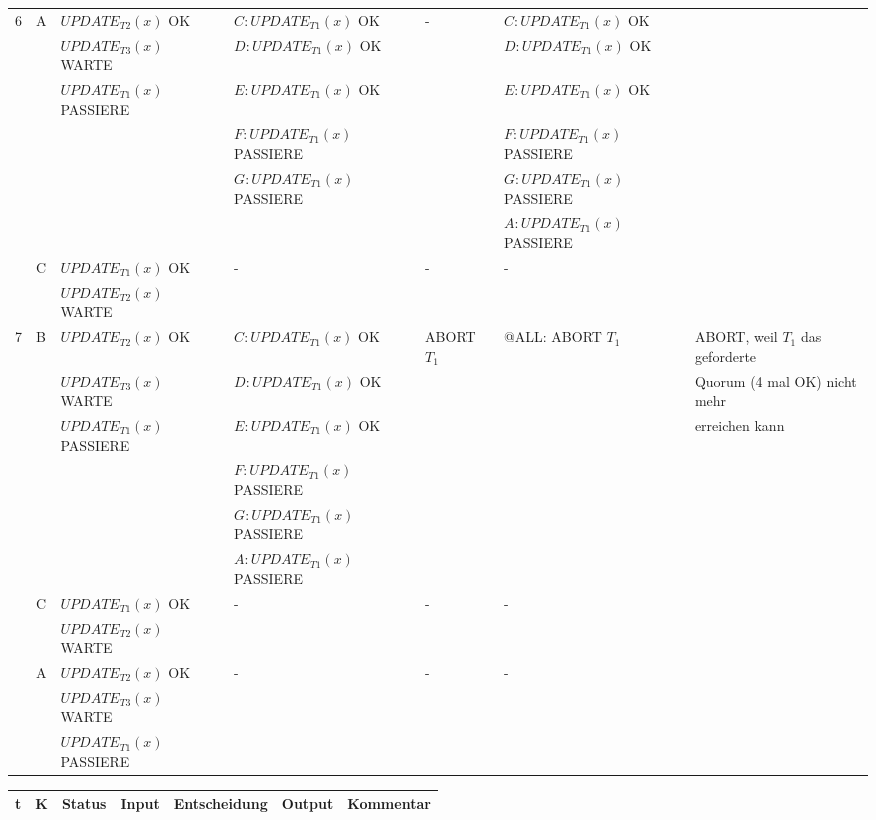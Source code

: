 \documentclass[a4paper]{article}
\begin{document}
\begin{landscape}
\begin{tabular}{| l | l | l | l | l | l | p{5cm} |}
6 & \multirow{6}{*}{A} 
			&    $UPDATE_{T2}(x)$ OK	      &  $C: UPDATE_{T1}(x)$ OK 	& - &	$C: UPDATE_{T1}(x)$ OK &\\
			&&  $UPDATE_{T3}(x)$ WARTE  & $D: UPDATE_{T1}(x)$ OK  &    &   $D: UPDATE_{T1}(x)$ OK & \\
			&&  $UPDATE_{T1}(x)$ PASSIERE & $E: UPDATE_{T1}(x)$ OK &    &  $E: UPDATE_{T1}(x)$ OK & \\
			& &																	   	& $F: UPDATE_{T1}(x)$ PASSIERE & & $F: UPDATE_{T1}(x)$ PASSIERE &\\
			& &																	   	& $G: UPDATE_{T1}(x)$ PASSIERE & & $G: UPDATE_{T1}(x)$ PASSIERE& \\
			& &																	   	&																					 & & $A: UPDATE_{T1}(x)$ PASSIERE& \\
\cline{2-7}
& \multirow{2}{*}{C} 
			&   $UPDATE_{T1}(x)$ OK 		& - 	& - &	 -  &\\
			&& $UPDATE_{T2}(x)$ WARTE   &   &   &	   &  \\
\hline
\hline


7 & \multirow{6}{*}{B} 
			&    $UPDATE_{T2}(x)$ OK	      &  $C: UPDATE_{T1}(x)$ OK 	& ABORT $T_1$ & @ALL: ABORT $T_1$ & ABORT, weil $T_1$ das geforderte\\
			&&  $UPDATE_{T3}(x)$ WARTE  & $D: UPDATE_{T1}(x)$ OK  &    &   & Quorum (4 mal OK) nicht mehr \\
			&&  $UPDATE_{T1}(x)$ PASSIERE & $E: UPDATE_{T1}(x)$ OK &    &  & erreichen kann \\
			& &																	   	& $F: UPDATE_{T1}(x)$ PASSIERE & & &\\
			& &																	   	& $G: UPDATE_{T1}(x)$ PASSIERE & & & \\
			& &																	   	& $A: UPDATE_{T1}(x)$ PASSIERE & & & \\
\cline{2-7}
& \multirow{2}{*}{C} 
			&   $UPDATE_{T1}(x)$ OK 		& - 	& - &	 -  &\\
			&& $UPDATE_{T2}(x)$ WARTE   &   &   &	   &  \\
\cline{2-7}
& \multirow{2}{*}{A} 
			&   $UPDATE_{T2}(x)$ OK 		& - 	& - &	 -  &\\
			&& $UPDATE_{T3}(x)$ WARTE   &   &   &	   &  \\
			&&  $UPDATE_{T1}(x)$ PASSIERE &  &  &   & \\
\hline
\end{tabular}
\newpage
\begin{tabular}{| l | l | l | l | l | l | p{6cm} |}
\hline
t & K & Status & Input & Entscheidung & Output & Kommentar \\
\hline
\hline


\end{tabular}
\end{landscape}
\end{document}
